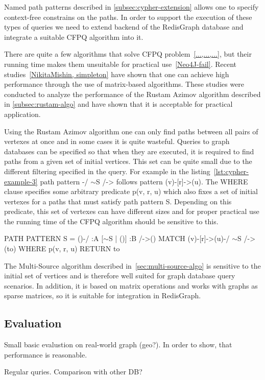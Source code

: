 Named path patterns described in \autoref{subsec:cypher-extension} allows one to specify context-free constrains on the paths. In order to support the execution of these types of queries we need to extend backend of the RedisGraph database and integrate a suitable CFPQ algorithm into it. 

There are quite a few algorithms that solve CFPQ problem~\ref{...,...,...}, but their running time makes them unsuitable for practical use~\ref{Neo4J-fail}. Recent studies~\ref{NikitaMishin, simpleton} have shown that one can achieve high performance through the use of matrix-based algorithms. These studies were conducted to analyze the performance of the Rustam Azimov algorithm described in \autoref{subsec:rustam-algo} and have shown that it is acceptable for practical application.

Using the Rustam Azimov algorithm one can only find paths between all pairs of vertexes at once and in some cases it is quite wasteful. Queries to graph databases can be specified so that when they are executed, it is required to find paths from a given set of initial vertices. This set can be quite small due to the different filtering specified in the query. For example in the listing~\ref{lst:cypher-example-3} path pattern \colorbox{blue!10}{-/ $\sim$S /->} follows pattern \colorbox{blue!10}{(v)-[r]->(u)}. The WHERE clause specifies some arbitrary predicate \colorbox{blue!10}{p(v, r, u)} which also fixes a set of initial vertexes for a paths that must satisfy path pattern \colorbox{blue!10}{S}. Depending on this predicate, this set of vertexes can have different sizes and for proper practical use the running time of the CFPQ algorithm should be sensitive to this.

\begin{algorithm}
\begin{algorithmic}[1]
\caption{...}
\label{lst:cypher-example-3}
\State PATH PATTERN S = ()-/ :A [$\sim$S | ()] :B /->()
\State MATCH (v)-[r]->(u)-/ $\sim$S /->(to)
\State WHERE p(v, r, u)
\State RETURN to
\end{algorithmic}
\end{algorithm}

The Multi-Source algorithm described in~\autoref{sec:multi-source-algo} is sensitive to the initial set of vertices and is therefore well suited for graph database query scenarios. In addition, it is based on matrix operations and works with graphs as sparse matrices, so it is suitable for integration in RedisGraph.



\subsection{Evaluation}

Small basic evalustion on real-world graph (geo?).
In order to show, that performance is reasonable.

Regular quries. Comparison with other DB?

